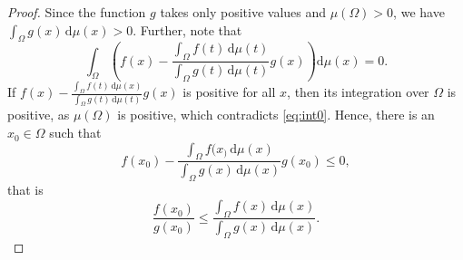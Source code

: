 \documentclass[12pt,a4paper,bold]{thesis}
\theoremstyle{definition}
\begin{document}
\begin{proof}
    Since the function $g$ takes only positive values and $\mu(\Omega) > 0$,
    we have $\int_{\Omega} g(x)\, \mathrm{d}\mu(x) > 0$. Further, note that 
    \begin{equation} \label{eq:int0}
        \int_{\Omega} \left(f(x) - \frac{\int_{\Omega} f(t)\, \mathrm{d}\mu(t)}
        {\int_{\Omega} g(t)\, \mathrm{d}\mu(t)} g(x) \right) \mathrm{d}\mu(x) = 0.
    \end{equation}
    If $f(x) - \frac{\int_{\Omega} f(t)\, \mathrm{d}\mu(x)}
    {\int_{\Omega} g(t)\, \mathrm{d}\mu(t)}g(x)$ is positive for all $x$, then 
    its integration over $\Omega$ is positive, as $\mu(\Omega)$ is positive,
    which contradicts \cref{eq:int0}. Hence, there is an $x_0 \in \Omega$ such that 
    \begin{equation*}
        f(x_0) - \frac{\int_{\Omega} f(x_)\, \mathrm{d}\mu(x)}
        {\int_{\Omega} g(x)\, \mathrm{d}\mu(x)}g(x_0) \leq 0,
    \end{equation*}
    that is
    \begin{equation*}
        \frac{f(x_0)}{g(x_0)} \leq \frac{\int_{\Omega} f(x)\, \mathrm{d}\mu(x)}
        {\int_{\Omega} g(x)\, \mathrm{d}\mu(x)}.
    \end{equation*}
\end{proof}
\end{document}
